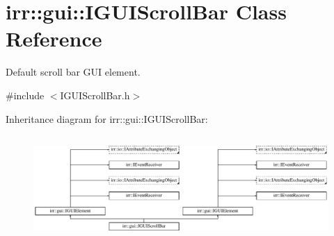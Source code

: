 \hypertarget{classirr_1_1gui_1_1IGUIScrollBar}{}\section{irr\+:\+:gui\+:\+:I\+G\+U\+I\+Scroll\+Bar Class Reference}
\label{classirr_1_1gui_1_1IGUIScrollBar}


Default scroll bar G\+UI element.  




{\ttfamily \#include $<$I\+G\+U\+I\+Scroll\+Bar.\+h$>$}

Inheritance diagram for irr\+:\+:gui\+:\+:I\+G\+U\+I\+Scroll\+Bar\+:\begin{figure}[H]
\begin{center}
\leavevmode
\includegraphics[height=4.038462cm]{classirr_1_1gui_1_1IGUIScrollBar}
\end{center}
\end{figure}
